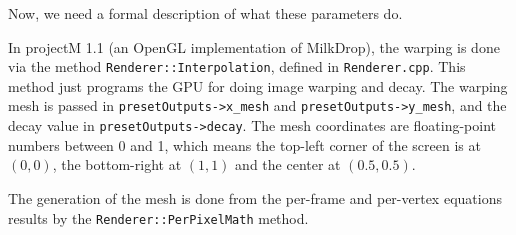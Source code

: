 \documentclass[a4paper,11pt]{article}
\begin{document}
Now, we need a formal description of what these parameters do.

In projectM 1.1 (an OpenGL implementation of MilkDrop), the warping is done via the method \verb!Renderer::Interpolation!, defined in \verb!Renderer.cpp!. This method just programs the GPU for doing image warping and decay. The warping mesh is passed in \verb!presetOutputs->x_mesh! and \verb!presetOutputs->y_mesh!, and the decay value in \verb!presetOutputs->decay!. The mesh coordinates are floating-point numbers between 0 and 1, which means the top-left corner of the screen is at $ (0, 0) $, the bottom-right at $ (1, 1) $ and the center at $ (0.5, 0.5) $.

The generation of the mesh is done from the per-frame and per-vertex equations results by the \verb!Renderer::PerPixelMath! method.
\end{document}
